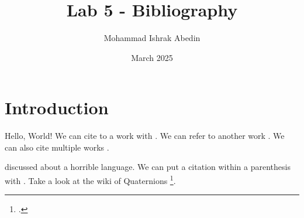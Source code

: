 \documentclass{article}
\title{Lab 5 - Bibliography}
\author{Mohammad Ishrak Abedin}
\date{March 2025}
\begin{document}
\maketitle

\tableofcontents

\section{Introduction}
Hello, World! We can cite to a work with \cite{norman2013design}. We can refer to another work \cite{twain2008tom}. We can also cite multiple works \cite{norman2013design, twain2008tom, wiki2025quaternion, wittern2016javascript}.

\textcite{wittern2016javascript} discussed about a horrible language. We can put a citation within a parenthesis with \parencite{norman2013design}. Take a look at the wiki of Quaternions \footcite{wiki2025quaternion}.

\printbibliography[heading=bibintoc, title={Bibliography}]

% 
% 
\end{document}
